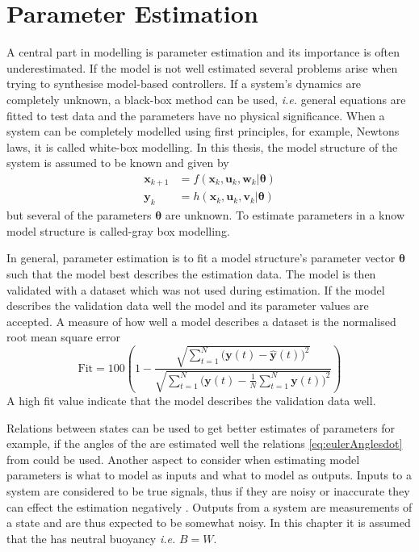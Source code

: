 \chapter{Parameter Estimation} \label{cha:parameterEstimation}
A central part in modelling is parameter estimation and its importance is often underestimated. If the model is not well estimated several problems arise when trying to synthesise model-based controllers. If a system's dynamics are completely unknown, a black-box method can be used, \emph{i.e.} general equations are fitted to test data and the parameters have no physical significance. When a system can be completely modelled using first principles, for example, Newtons laws, it is called white-box modelling. In this thesis, the model structure of the system is assumed to be known and given by
\begin{align}
\boldsymbol{x}_{k+1} &=f(\boldsymbol{x}_k,\boldsymbol{u}_k,\boldsymbol{w}_k|\boldsymbol{\theta})\\
\boldsymbol{y}_{k} &= h(\boldsymbol{x}_k,\boldsymbol{u}_k,\boldsymbol{v}_k|\boldsymbol{\theta})
\end{align}
but several of the parameters $\boldsymbol{\theta}$ are unknown.
To estimate parameters in a know model structure is called-gray box modelling. 

In general, parameter estimation is to fit a model structure's parameter vector $\boldsymbol{\theta}$ such that the model best describes the estimation data. The model is then validated with a dataset which was not used during estimation. If the model describes the validation data well the model and its parameter values are accepted. A measure of how well a model describes a dataset is the normalised root mean square error
\begin{equation}
\text{Fit} = 100 \left(1 - \frac{\sqrt{\sum\limits_{t=1}^N \bigr(\boldsymbol{y}(t) - \hat{\boldsymbol{y}}(t)\bigl)^2}}{\sqrt{\sum\limits_{t=1}^N \bigr(\boldsymbol{y}(t)-\frac{1}{N}\sum\limits_{t=1}^N \boldsymbol{y}(t)\bigl)^2}}\right)
\end{equation} 
A high fit value indicate that the model describes the validation data well.

Relations between states can be used to get better estimates of parameters for example, if the angles of the \abbrROV are estimated well the relations \eqref{eq:eulerAnglesdot} from  could be used. Another aspect to consider when estimating model parameters is what to model as inputs and what to model as outputs. Inputs to a system are considered to be true signals, thus if they are noisy or inaccurate they can effect the estimation negatively \citep{modellbygge}. Outputs from a system are measurements of a state and are thus expected to be somewhat noisy. In this chapter it is assumed that the \abbrROV has neutral buoyancy \emph{i.e.} $B = W$. 

